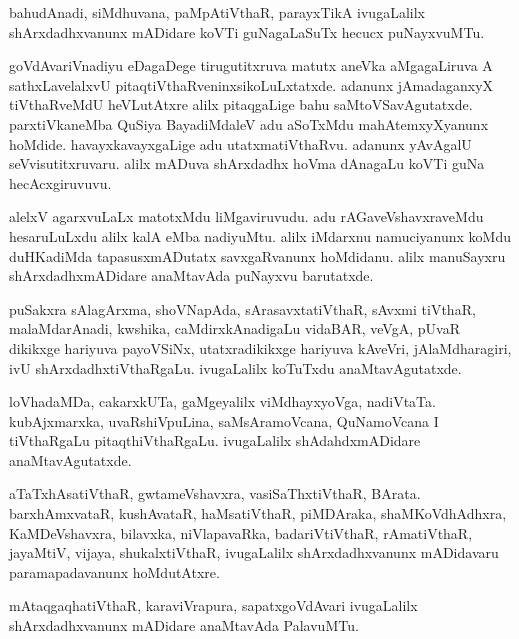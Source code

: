 \documentclass{article}
\begin{document}
\begin{mn}%
bahudAnadi, siMdhuvana, paMpAtiVthaR, parayxTikA ivugaLalilx
shArxdadhxvanunx mADidare koVTi guNagaLaSuTx hecucx puNayxvuMTu.
\end{mn}

\begin{mn}%
goVdAvariVnadiyu eDagaDege tirugutitxruva matutx aneVka aMgagaLiruva A
sathxLavelalxvU pitaqtiVthaRveninxsikoLuLxtatxde. adanunx jAmadaganxyX
tiVthaRveMdU heVLutAtxre alilx pitaqgaLige bahu
saMtoVSavAgutatxde. parxtiVkaneMba QuSiya BayadiMdaleV adu aSoTxMdu
mahAtemxyXyanunx hoMdide. havayxkavayxgaLige adu
utatxmatiVthaRvu. adanunx yAvAgalU seVvisutitxruvaru. alilx mADuva
shArxdadhx hoVma dAnagaLu koVTi guNa hecAcxgiruvuvu.
\end{mn}

\begin{mn}%
alelxV agarxvuLaLx matotxMdu liMgaviruvudu. adu rAGaveVshavxraveMdu
hesaruLuLxdu alilx kalA eMba nadiyuMtu. alilx iMdarxnu namuciyanunx
koMdu duHKadiMda tapasusxmADutatx savxgaRvanunx hoMdidanu. alilx
manuSayxru shArxdadhxmADidare anaMtavAda puNayxvu barutatxde.
\end{mn}

\begin{mn}%
puSakxra sAlagArxma, shoVNapAda, sArasavxtatiVthaR, sAvxmi tiVthaR,
malaMdarAnadi, kwshika, caMdirxkAnadigaLu vidaBAR, veVgA, pUvaR
dikikxge hariyuva payoVSiNx, utatxradikikxge hariyuva kAveVri,
jAlaMdharagiri, ivU shArxdadhxtiVthaRgaLu. ivugaLalilx koTuTxdu anaMtavAgutatxde.
\end{mn}

\begin{mn}%
loVhadaMDa, cakarxkUTa, gaMgeyalilx viMdhayxyoVga,
nadiVtaTa. kubAjxmarxka, uvaRshiVpuLina, saMsAramoVcana, QuNamoVcana I
tiVthaRgaLu pitaqthiVthaRgaLu. ivugaLalilx shAdahdxmADidare anaMtavAgutatxde.
\end{mn}

\begin{mn}%
aTaTxhAsatiVthaR, gwtameVshavxra, vasiSaThxtiVthaR,
BArata. barxhAmxvataR, kushAvataR, haMsatiVthaR, piMDAraka,
shaMKoVdhAdhxra, KaMDeVshavxra, bilavxka, niVlapavaRka,
badariVtiVthaR, rAmatiVthaR, jayaMtiV, vijaya, shukalxtiVthaR,
ivugaLalilx shArxdadhxvanunx mADidavaru paramapadavanunx hoMdutAtxre.
\end{mn}

\begin{mn}
mAtaqgaqhatiVthaR, karaviVrapura, sapatxgoVdAvari ivugaLalilx
shArxdadhxvanunx mADidare anaMtavAda PalavuMTu.
\end{mn}
\end{document}
